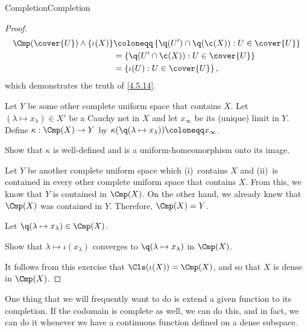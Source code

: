 \begin{thm}{Completion}{Completion}
\begin{proof}
\begin{equation}
\begin{split}
\Cmp (\cover{U}) \wedge \{ \iota (X)\} & \coloneqq \left\{ \q (U')\cap \q (\c (X)):U\in \cover{U}\right\}  \\
& =\left\{ \q (U'\cap \c (X)):U\in \cover{U}\right\} \\
& =\left\{ \iota (U):U\in \cover{U}\right\} ,
\end{split}
\end{equation}
which demonstrates the truth of \eqref{4.5.14}.

Let $Y$ be some other complete uniform space that contains $X$.  Let $(\lambda \mapsto x_{\lambda})\in X'$ be a Cauchy net in $X$ and let $x_\infty$ be its (unique) limit in $Y$.  Define $\kappa :\Cmp (X)\rightarrow Y$ by $\kappa (\q (\lambda \mapsto x_{\lambda})) \coloneqq x_\infty$.
\begin{exr}[breakable=false]{}{}
Show that $\kappa$ is well-defined and is a uniform-homeomorphism onto its image.
\end{exr}

Let $Y$ be another complete uniform space which (i)~contains $X$ and (ii)~is contained in every other complete uniform space that contains $X$.  From this, we know that $Y$ is contained in $\Cmp (X)$.  On the other hand, we already knew that $\Cmp (X)$ was contained in $Y$.  Therefore, $\Cmp (X)=Y$.

Let $\q (\lambda \mapsto x_{\lambda})\in \Cmp (X)$.
\begin{exr}[breakable=false]{}{}
Show that $\lambda \mapsto \iota (x_\lambda )$ converges to $\q (\lambda \mapsto x_{\lambda})$ in $\Cmp (X)$.
\end{exr}
It follows from this exercise that $\Cls (\iota (X))=\Cmp (X)$, and so that $X$ is dense in $\Cmp (X)$.
\end{proof}
\end{thm}
One thing that we will frequently want to do is extend a given function to its completion.  If the codomain is complete as well, we can do this, and in fact, we can do it whenever we have a continuous function defined on a dense subspace.
